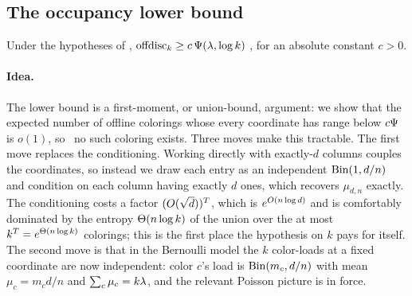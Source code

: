 \subsection{The occupancy lower bound}\label{sec:offline-lower}

\begin{lemma}\label{lem:offline-lower}
Under the hypotheses of , $\mathrm{offdisc}_k\ge c\,\Psi(\lambda,\log k)$ \whp, for an absolute constant $c>0$.
\end{lemma}

\paragraph{Idea.}
The lower bound is a first-moment, or union-bound, argument: we show that the expected number of offline colorings whose
every coordinate has range below $c\Psi$ is $o(1)$, so \whp\ no such coloring exists. Three moves make this tractable. The
first move replaces the conditioning. Working directly with exactly-$d$ columns couples the coordinates, so instead we draw
each entry as an independent $\mathrm{Bin}(1,d/n)$ and condition on each column having exactly $d$ ones, which recovers $\mu_{d,n}$
exactly. The conditioning costs a factor $(O(\sqrt d))^{T}$, which is $e^{O(n\log d)}$ and is comfortably dominated by
the entropy $\Theta(n\log k)$ of the union over the at most $k^{T}=e^{\Theta(n\log k)}$ colorings; this is the first place the
hypothesis on $k$ pays for itself. The second move is that in the Bernoulli model the $k$ color-loads at a fixed coordinate
are now independent: color $c$'s load is $\mathrm{Bin}(m_c,d/n)$ with mean $\mu_c=m_c d/n$ and $\sum_c\mu_c=k\lambda$, and the relevant
Poisson picture is in force.

